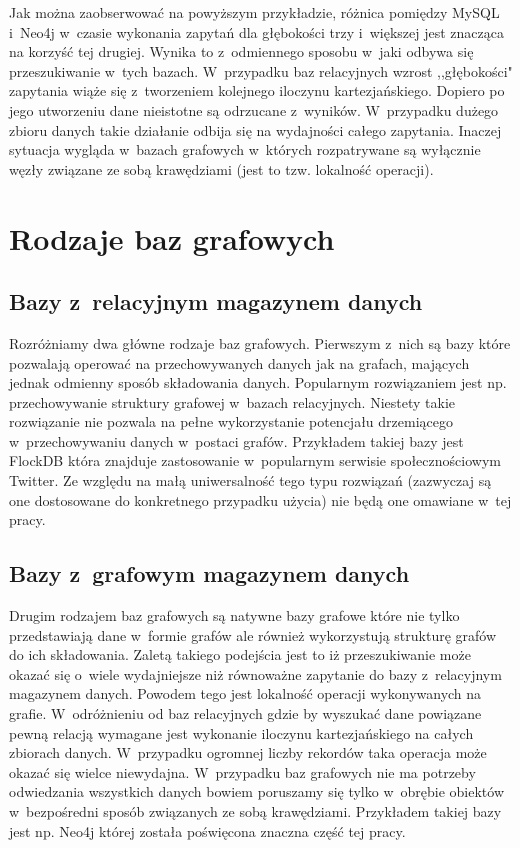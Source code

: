 \documentclass[brudnopis]{xmgr}
\begin{document}
Jak można zaobserwować na powyższym przykładzie, różnica pomiędzy MySQL i~Neo4j w~czasie wykonania zapytań dla głębokości trzy i~większej jest znacząca na korzyść tej drugiej. Wynika to z~odmiennego sposobu w~jaki odbywa się przeszukiwanie w~tych bazach. W~przypadku baz relacyjnych wzrost ,,głębokości" zapytania wiąże się z~tworzeniem kolejnego iloczynu kartezjańskiego. Dopiero po jego utworzeniu dane nieistotne są odrzucane z~wyników. W~przypadku dużego zbioru danych takie działanie odbija się na wydajności całego zapytania. Inaczej sytuacja wygląda w~bazach grafowych w~których rozpatrywane są wyłącznie węzły związane ze sobą krawędziami (jest to tzw. lokalność operacji).

\section{Rodzaje baz grafowych}

\subsection{Bazy z~relacyjnym magazynem danych}

Rozróżniamy dwa główne rodzaje baz grafowych. Pierwszym z~nich są bazy które pozwalają operować na przechowywanych danych jak na grafach, mających jednak odmienny sposób składowania danych. Popularnym rozwiązaniem jest np. przechowywanie struktury grafowej w~bazach relacyjnych. Niestety takie rozwiązanie nie pozwala na pełne wykorzystanie potencjału drzemiącego w~przechowywaniu danych w~postaci grafów. Przykładem takiej bazy jest FlockDB\cite{flockdb} która znajduje zastosowanie w~popularnym serwisie społecznościowym Twitter. Ze względu na małą uniwersalność tego typu rozwiązań (zazwyczaj są one dostosowane do konkretnego przypadku użycia) nie będą one omawiane w~tej pracy.

\subsection{Bazy z~grafowym magazynem danych}
Drugim rodzajem baz grafowych są natywne bazy grafowe które nie tylko przedstawiają dane w~formie grafów ale również wykorzystują strukturę grafów do ich składowania. Zaletą takiego podejścia jest to iż przeszukiwanie może okazać się o~wiele wydajniejsze niż równoważne zapytanie do bazy z~relacyjnym magazynem danych. Powodem tego jest lokalność operacji wykonywanych na grafie. W~odróżnieniu od baz relacyjnych gdzie by wyszukać dane powiązane pewną relacją wymagane jest wykonanie iloczynu kartezjańskiego na całych zbiorach danych. W~przypadku ogromnej liczby rekordów taka operacja może okazać się wielce niewydajna. W~przypadku baz grafowych nie ma potrzeby odwiedzania wszystkich danych bowiem poruszamy się tylko w~obrębie obiektów w~bezpośredni sposób związanych ze sobą krawędziami. Przykładem takiej bazy jest np. Neo4j której została poświęcona znaczna część tej pracy.
\end{document}

